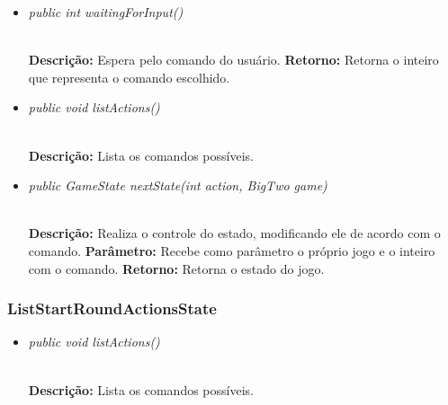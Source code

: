 \documentclass[12pt]{article}
\begin{document}
\vspace{0.2 true cm}

\begin{itemize}
\item \begin{large}\textit{public int waitingForInput()}\end{large}\\
\subitem \textbf{Descrição:} Espera pelo comando do usuário.
\subitem \textbf{Retorno:} Retorna o inteiro que representa o comando escolhido.
\end{itemize}

\vspace{0.2 true cm}

\begin{itemize}
\item \begin{large}\textit{public void listActions()}\end{large}\\
\subitem \textbf{Descrição:} Lista os comandos possíveis.
\end{itemize}

\vspace{0.2 true cm}

\begin{itemize}
\item \begin{large}\textit{public GameState nextState(int action, BigTwo game)}\end{large}\\
\subitem \textbf{Descrição:} Realiza o controle do estado, modificando ele de acordo com o comando.
\subitem \textbf{Parâmetro:} Recebe como parâmetro o próprio jogo e o inteiro com o comando.
\subitem \textbf{Retorno:} Retorna o estado do jogo.
\end{itemize}

\vspace{0.2 true cm}

\subsubsection{ListStartRoundActionsState}

\begin{itemize}
\item \begin{large}\textit{public void listActions()}\end{large}\\
\subitem \textbf{Descrição:} Lista os comandos possíveis.
\end{itemize}
\end{document}

